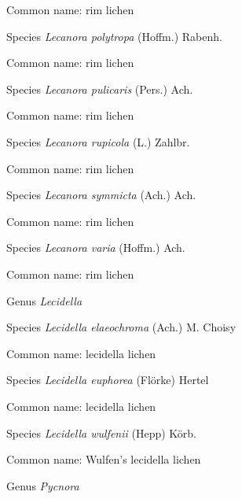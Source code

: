 \documentclass[9pt, article]{memoir}
\begin{document}
\begin{multicols}{2}
Common name: rim lichen

\vspace{6pt}\noindent\hspace{36pt}Species \textit{Lecanora polytropa} (Hoffm.) Rabenh.


Common name: rim lichen

\vspace{6pt}\noindent\hspace{36pt}Species \textit{Lecanora pulicaris} (Pers.) Ach.


Common name: rim lichen

\vspace{6pt}\noindent\hspace{36pt}Species \textit{Lecanora rupicola} (L.) Zahlbr.


Common name: rim lichen

\vspace{6pt}\noindent\hspace{36pt}Species \textit{Lecanora symmicta} (Ach.) Ach.


Common name: rim lichen

\vspace{6pt}\noindent\hspace{36pt}Species \textit{Lecanora varia} (Hoffm.) Ach.


Common name: rim lichen

\vspace{6pt}\noindent\hspace{30pt}Genus \textit{Lecidella}


\vspace{6pt}\noindent\hspace{36pt}Species \textit{Lecidella elaeochroma} (Ach.) M. Choisy


Common name: lecidella lichen

\vspace{6pt}\noindent\hspace{36pt}Species \textit{Lecidella euphorea} (Flörke) Hertel


Common name: lecidella lichen

\vspace{6pt}\noindent\hspace{36pt}Species \textit{Lecidella wulfenii} (Hepp) Körb.


Common name: Wulfen's lecidella lichen

\vspace{6pt}\noindent\hspace{30pt}Genus \textit{Pycnora }



\end{multicols}
\end{document}
